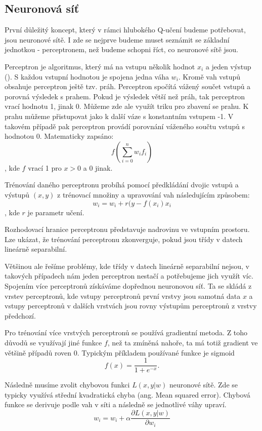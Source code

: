 \subsection{Neuronová síť}
První důležitý koncept, který v rámci hlubokého Q-učení budeme potřebovat, jsou neuronové sítě. 
I zde se nejprve budeme muset seznámit se základní jednotkou - perceptronem, než budeme schopni říct, co neuronové sítě jsou.
\par
Perceptron je algoritmus, který má na vstupu několik hodnot $x_i$ a jeden výstup (\cite{perceptronNeuralNetworks}). S každou vstupní hodnotou je spojena jedna váha $w_i$.
Kromě vah vstupů obsahuje perceptron ještě tzv. práh. Perceptron spočítá vážený součet vstupů a porovná výsledek s prahem. Pokud je výsledek větší než práh, tak perceptron vrací hodnotu 1, jinak 0.
Můžeme zde ale využít triku pro zbavení se prahu. K prahu můžeme přistupovat jako k další váze s konstantním vstupem -1.
V takovém případě pak perceptron provádí porovnání váženého součtu vstupů s hodnotou 0. 
\newline
Matematicky zapsáno:
\[f(\sum_{i=0}^{n} w_if_i)\], kde $f$ vrací 1 pro $x>0$ a 0 jinak.

Trénování daného perceptronu probíhá pomocí předkládání dvojic vstupů a výstupů $(x,y)$ z trénovací množiny a upravování vah následujícím způsobem:
\newline
\[w_i = w_i + r(y-f(x_i)x_i\], kde $r$ je parametr učení.

Rozhodovací hranice perceptronu představuje nadrovinu ve vstupním prostoru. Lze ukázat, že trénování perceptronu zkonverguje, pokud jsou třídy v datech lineárně separabilní.

Většinou ale řešíme problémy, kde třídy v datech lineárně separabilní nejsou, v takových případech nám jeden perceptron nestačí a potřebujeme jich využít víc.
Spojením více perceptronů získáváme dopřednou neuronovou síť.
Ta se skládá z vrstev perceptronů, kde vstupy perceptronů první vrstvy jsou samotná data $x$ a vstupy perceptronů v dalších vrstvách jsou rovny výstupům perceptronů z vrstvy předchozí.

Pro trénování více vrstvých perceptronů se používá gradientní metoda. Z toho důvodů se využívají jiné funkce $f$, než ta zmíněná nahoře, ta má totiž gradient ve většině případů roven 0.
Typickým příkladem používané funkce je sigmoid \[f(x) = \frac{1}{1+e^{-x}}.\]

Následně musíme zvolit chybovou funkci $L(x,y|w)$ neuronové sítě. Zde se typicky využívá střední kvadratická chyba (ang. Mean squared error).
Chybová funkce se derivuje podle vah v síti a následně se jednotlivé váhy upraví.
\newline
\[w_i = w_i + \alpha\frac{\partial L(x,y|w)}{\partial w_i}\]





